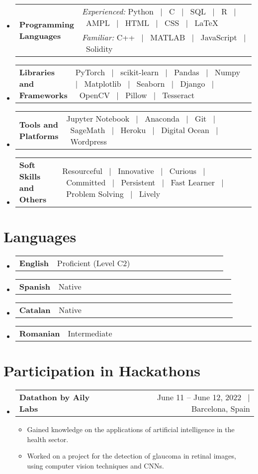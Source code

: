 \documentclass[a4paper,11pt]{article}
\makeatletter
\newcommand{\resumeSectionTypeOne}[2]{
  \item\begin{tabular*}{0.99\textwidth}[t]{
    p{0.18\linewidth}p{0.81\linewidth}
  }
  \textbf{#1} & #2
  \end{tabular*}\vspace{-2pt}
}
\newcommand{\resumeSectionTypeTwo}[3]{
  \item\begin{tabular*}{0.99\textwidth}[t]{
    p{0.18\linewidth}p{0.81\linewidth}
  }
  \multirow{2}{0.20\linewidth}{\textbf{#1}} & #2 \\
                                            & #3
  \end{tabular*}\vspace{-2pt}
}
\newcommand{\resumeTrioHeading}[3]{
  \item
    \begin{tabular*}{0.96\textwidth}[t]{
      l@{\extracolsep{\fill}}c@{\extracolsep{\fill}}r
    }
      \textbf{#1} & \small \textit{#2} & \small #3
    \end{tabular*}
}
\newcommand{\resumeHeadingListStart}{
  \begin{itemize}[leftmargin=0.15in, label={}]
}
\newcommand{\resumeHeadingListEnd}{\end{itemize}}
\makeatother
\begin{document}
  \resumeHeadingListStart{}
    \resumeSectionTypeTwo{Programming Languages}{\textit{\small Experienced:}\: Python \ $|$ \ C \ $|$ \ SQL \ $|$ \ R \ $|$ \ AMPL \ $|$ \ HTML \ $|$ \ CSS \ $|$ \ \LaTeX}{\textit{\small Familiar:}\:  C++ \ $|$ \ MATLAB \ $|$ \ JavaScript \ $|$ \ Solidity}
  \resumeHeadingListEnd{}

  \resumeHeadingListStart{}
    \resumeSectionTypeOne{Libraries and Frameworks}{PyTorch \ $|$ \ scikit-learn \ $|$ \ Pandas \ $|$ \ Numpy \ $|$ \ Matplotlib \ $|$ \ Seaborn \ $|$ \ Django \ $|$ \ OpenCV \ $|$ \ Pillow \ $|$ \ Tesseract}
  \resumeHeadingListEnd{}
  
  \resumeHeadingListStart{}
    \resumeSectionTypeOne{Tools and Platforms}{Jupyter Notebook \ $|$ \ Anaconda \ $|$ \ Git \ $|$ \ SageMath \ $|$ \ Heroku \ $|$ \ Digital Ocean \ $|$ \ Wordpress}
  \resumeHeadingListEnd{}

  \resumeHeadingListStart{}
    \resumeSectionTypeOne{Soft Skills and Others}{Resourceful \ $|$ \ Innovative \ $|$ \ Curious \ $|$ \ Committed \ $|$ \ Persistent \ $|$ \ Fast Learner \ $|$ \ Problem Solving \ $|$ \ Lively }
  \resumeHeadingListEnd{}

\section{Languages}
  \resumeHeadingListStart{}
    \resumeSectionTypeOne{English}{Proficient (Level C2)}
    \resumeSectionTypeOne{Spanish}{Native}
    \resumeSectionTypeOne{Catalan}{Native}
    \resumeSectionTypeOne{Romanian}{Intermediate}
  \resumeHeadingListEnd{}

\section{Participation in Hackathons}
  \resumeHeadingListStart{}
    \resumeTrioHeading{Datathon by Aily Labs}{}{June 11 – June 12, 2022 \ $|$ \ Barcelona, Spain}
      \begin{itemize}[leftmargin=3em, itemsep=0.1em, topsep=2pt]
        \item \small Gained knowledge on the applications of artificial intelligence in the health sector.
        \item \small Worked on a project for the detection of glaucoma in retinal images, using computer vision techniques and CNNs.
      \end{itemize}
  \resumeHeadingListEnd{}
\end{document}
